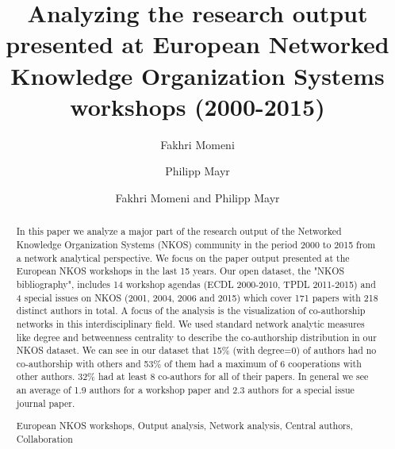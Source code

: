 \documentclass[runningheads,a4paper]{llncs}
\newcommand{\keywords}[1]{\par\addvspace\baselineskip
\noindent\keywordname\enspace\ignorespaces#1}
\begin{document}
\mainmatter  %

\title{Analyzing the research output presented at European Networked Knowledge Organization Systems workshops (2000-2015)}



%
%
\author{Fakhri Momeni%
	\and Philipp Mayr}
%

\author{Fakhri Momeni and Philipp Mayr}

%
%

\maketitle


\begin{abstract}		
In this paper we analyze a major part of the research output of the Networked Knowledge Organization Systems (NKOS) community in the period 2000 to 2015 from a network analytical perspective. We focus on the paper output presented at the European NKOS workshops in the last 15 years. Our open dataset, the "NKOS bibliography", includes 14 workshop agendas (ECDL 2000-2010, TPDL 2011-2015) and 4 special issues on NKOS (2001, 2004, 2006 and 2015) which cover 171 papers with 218 distinct authors in total. A focus of the analysis is the visualization of co-authorship networks in this interdisciplinary field. We used standard network analytic measures like degree and betweenness centrality to describe the co-authorship distribution in our NKOS dataset.  We can see in our dataset that 15\% (with degree=0) of authors had no co-authorship with others and 53\% of them had a maximum of 6 cooperations with other authors. 32\% had at least 8 co-authors for all of their papers. In general we see an average of 1.9 authors for a workshop paper and 2.3 authors for a special issue journal paper.

 
\keywords{European NKOS workshops, Output analysis, Network analysis, Central authors, Collaboration}
\end{abstract}
\end{document}

